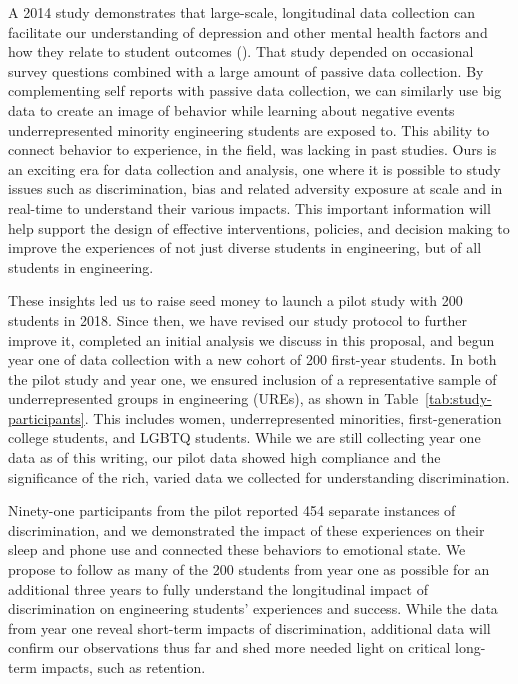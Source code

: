 A 2014 study demonstrates that large-scale, longitudinal data collection can facilitate our understanding of depression and other mental health factors and how they relate to student outcomes (\eg \cite{wang2014studentlife}). That study depended on occasional survey questions combined with a large amount of passive data collection. By complementing self reports with passive data collection, we can similarly use big data to create an image of behavior while learning about negative events underrepresented minority engineering students are exposed to. This ability to connect behavior to experience, in the field, was lacking in past studies. Ours is an exciting era for data collection and analysis, one where it is possible to study issues such as discrimination, bias and related adversity exposure at scale and in real-time to understand their various impacts. This important information will help support the design of effective interventions, policies, and decision making to improve the experiences of not just diverse students in engineering, but of all students in engineering. 
 
These insights led us to raise seed money to launch a pilot study with 200 students in 2018. Since then, we have revised our study protocol to further improve it, completed an initial analysis we discuss in this proposal, and begun year one of data collection with a new cohort of 200 first-year students. In both the pilot study and year one, we ensured inclusion of a representative sample of underrepresented groups in engineering (UREs), as shown in Table~\ref{tab:study-participants}. This includes women, underrepresented minorities, first-generation college students, and LGBTQ students. While we are still collecting year one data as of this writing, our pilot data showed high compliance and the significance of the rich, varied data we collected for understanding discrimination.

Ninety-one participants from the pilot reported  454 separate instances of discrimination, and we demonstrated the impact of these experiences on their sleep and phone use and connected these behaviors to emotional state.  
We propose to follow as many of the 200 students from year one as possible for an additional three years to fully understand the longitudinal impact of discrimination on engineering students’ experiences and success. While the data from year one reveal short-term impacts of discrimination, additional data will confirm our observations thus far and shed more needed light on critical long-term impacts, such as retention.

